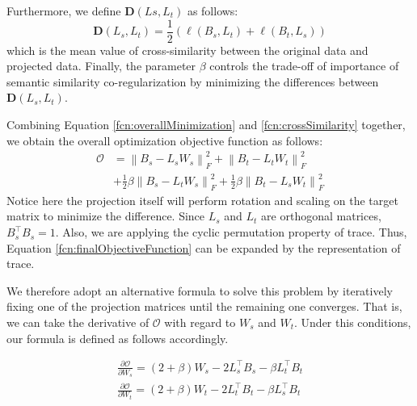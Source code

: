 Furthermore, we define $\mathbf{D}\left(L{s}, L_{t}\right)$ as follows:
\begin{equation}
\label{fcn:crossSimilarity}
    \mathbf{D}\left(L_{s}, L_{t}\right) =\frac{1}{2}\left(\ell\left(B_s, L_{t}\right) + \ell\left(B_t, L_{s}\right)\right)
\end{equation}
which is the mean value of cross-similarity between the original data and projected data. Finally, the parameter $\beta$ controls the trade-off of importance of semantic similarity co-regularization by minimizing the differences between $\mathbf{D}(L_{s}, L_{t})$.

Combining Equation \ref{fcn:overallMinimization} and \ref{fcn:crossSimilarity} together, we obtain the overall optimization objective function as follows:
\begin{equation}
\label{fcn:finalObjectiveFunction}
\begin{split}
    \mathcal{O} &= \left \| B_s - L_{s}W_{s}  \right \|_{F}^2 + \left \| B_t - L_{t}W_{t}\right \|_{F}^2 \\
    &+ \frac{1}{2}\beta \left \| B_s - L_{t}W_{s}  \right \|_{F}^2 + \frac{1}{2}\beta \left \| B_t - L_{s}W_{t}\right \|_{F}^2
\end{split}
\end{equation}
Notice here the projection itself will perform rotation and scaling on the target matrix to minimize the difference.
Since $L_s$ and $L_t$ are orthogonal matrices, $B_{s}^{\top}B_{s}=1$. Also, we are applying the cyclic permutation property of trace. Thus, Equation \ref{fcn:finalObjectiveFunction} can be expanded by the representation of trace.

We therefore adopt an alternative formula to solve this problem by iteratively fixing one of the projection matrices until the remaining one converges. 
That is, we can take the derivative of $\mathcal{O}$ with regard to $W_s$ and $W_t$.
Under this conditions, our formula is defined as follows accordingly.

\begin{equation}
\begin{split}
    \frac{\partial \mathcal{O}}{\partial W_{s}} =  (2+\beta)W_{s} -2L_{s}^{\top}B_{s} - \beta L_{t}^{\top}B_{t} \\
    \frac{\partial \mathcal{O}}{\partial W_{t}} =  (2+\beta)W_{t} -2L_{t}^{\top}B_{t} - \beta L_{s}^{\top}B_{t} \\
\end{split}
\end{equation}

